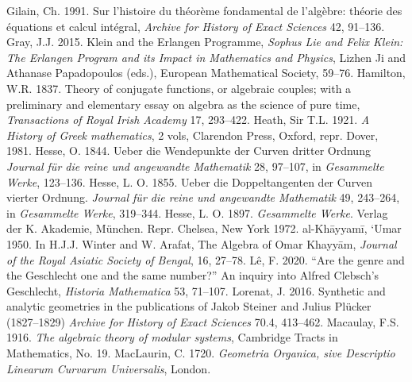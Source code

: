  \newline\indent  Gilain, Ch. 1991. Sur l'histoire du th\'eor\`eme  fondamental de l'alg\`ebre: th\'eorie des \'equations et calcul int\'egral, \emph{Archive for History of Exact Sciences} 42, 91--136. 
\newline\indent  Gray, J.J. 2015. Klein and the Erlangen Programme, \emph{Sophus Lie and Felix Klein: The Erlangen Program and its Impact in Mathematics and Physics}, Lizhen Ji and Athanase Papadopoulos (eds.), European Mathematical Society, 59--76.
 \newline\indent Hamilton, W.R.  1837. Theory of conjugate functions, or algebraic couples; with a preliminary and elementary essay on algebra as the science of pure time, \emph{Transactions of Royal Irish Academy}  17, 293--422. 
 \newline\indent Heath, Sir T.L. 1921. \emph{A History of Greek mathematics}, 2 vols, Clarendon Press, Oxford, repr. Dover, 1981.
 \newline\indent Hesse, O. 1844. Ueber die Wendepunkte der  Curven dritter Ordnung \emph{Journal f{\"u}r die reine und angewandte Mathematik} 28, 97--107, in \emph{Gesammelte Werke}, 123--136.
\newline\indent  Hesse, L. O. 1855. Ueber die Doppeltangenten der Curven vierter Ordnung. \emph{Journal f{\"u}r die reine und angewandte Mathematik} 49, 243--264, in \emph{Gesammelte Werke}, 319--344.
\newline\indent Hesse, L. O. 1897. \emph{Gesammelte Werke}. Verlag der K.  Akademie, M\"{u}nchen. Repr. Chelsea, New York 1972.
\newline\indent al-Kh\={a}yyam\={i}, `Umar 1950. In H.J.J. Winter and W. Arafat, The Algebra of Omar Khayy\={a}m, \emph{Journal of the Royal Asiatic Society of Bengal}, 16, 27--78.
 \newline\indent L\^e, F. 2020. ``Are the genre and the Geschlecht one and the same number?'' An inquiry into Alfred Clebsch's Geschlecht, \emph{Historia Mathematica} 53, 71--107.
 \newline\indent Lorenat, J. 2016. Synthetic and analytic geometries in the publications of Jakob Steiner and Julius Pl\"ucker (1827--1829) \emph{Archive for History of Exact Sciences}  70.4, 413--462.
 \newline\indent Macaulay, F.S.  1916.  \emph{The algebraic theory of modular systems},  Cambridge Tracts in Mathematics, No. 19.
\newline\indent  MacLaurin, C. 1720.  \emph{Geometria Organica, sive Descriptio Linearum Curvarum Universalis}, London.
